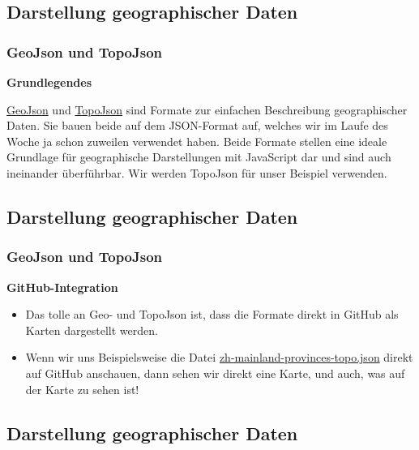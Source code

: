 \subsection{\texorpdfstring{{Darstellung geographischer
Daten}}{Darstellung geographischer Daten}}

\subsubsection{\texorpdfstring{{GeoJson und
TopoJson}}{GeoJson und TopoJson}}

\textbf{Grundlegendes}

\href{http://geojson.org}{GeoJson} und
\href{https://github.com/mbostock/topojson}{TopoJson} sind Formate zur
einfachen Beschreibung geographischer Daten. Sie bauen beide auf dem
JSON-Format auf, welches wir im Laufe des Woche ja schon zuweilen
verwendet haben. Beide Formate stellen eine ideale Grundlage für
geographische Darstellungen mit JavaScript dar und sind auch ineinander
überführbar. Wir werden TopoJson für unser Beispiel verwenden.

\subsection{\texorpdfstring{{Darstellung geographischer
Daten}}{Darstellung geographischer Daten}}

\subsubsection{\texorpdfstring{{GeoJson und
TopoJson}}{GeoJson und TopoJson}}

\textbf{GitHub-Integration}

\begin{itemize}
\item
  Das tolle an Geo- und TopoJson ist, dass die Formate direkt in GitHub
  als Karten dargestellt werden.
\item
  Wenn wir uns Beispielsweise die Datei
  \href{https://github.com/LinguList/pyjs-seminar/blob/master/website/demos/china/maps/zh-mainland-provinces.topo.json}{zh-mainland-provinces-topo.json}
  direkt auf GitHub anschauen, dann sehen wir direkt eine Karte, und
  auch, was auf der Karte zu sehen ist!
\end{itemize}

\subsection{\texorpdfstring{{Darstellung geographischer
Daten}}{Darstellung geographischer Daten}}

